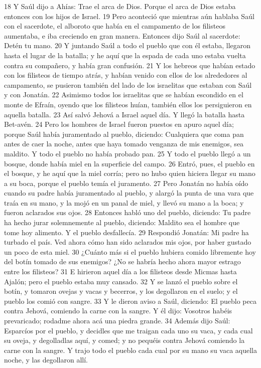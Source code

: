 18 Y Saúl dijo a Ahías: Trae el arca de Dios. Porque el arca de Dios estaba entonces con los hijos de Israel.
19 Pero aconteció que mientras aún hablaba Saúl con el sacerdote, el alboroto que había en el campamento de los filisteos aumentaba, e iba creciendo en gran manera. Entonces dijo Saúl al sacerdote: Detén tu mano.
20 Y juntando Saúl a todo el pueblo que con él estaba, llegaron hasta el lugar de la batalla; y he aquí que la espada de cada uno estaba vuelta contra su compañero, y había gran confusión.
21 Y los hebreos que habían estado con los filisteos de tiempo atrás, y habían venido con ellos de los alrededores al campamento, se pusieron también del lado de los israelitas que estaban con Saúl y con Jonatán.
22 Asimismo todos los israelitas que se habían escondido en el monte de Efraín, oyendo que los filisteos huían, también ellos los persiguieron en aquella batalla.
23 Así salvó Jehová a Israel aquel día. Y llegó la batalla hasta Bet-avén.
24 Pero los hombres de Israel fueron puestos en apuro aquel día; porque Saúl había juramentado al pueblo, diciendo: Cualquiera que coma pan antes de caer la noche, antes que haya tomado venganza de mis enemigos, sea maldito. Y todo el pueblo no había probado pan.
25 Y todo el pueblo llegó a un bosque, donde había miel en la superficie del campo.
26 Entró, pues, el pueblo en el bosque, y he aquí que la miel corría; pero no hubo quien hiciera llegar su mano a su boca, porque el pueblo temía el juramento.
27 Pero Jonatán no había oído cuando su padre había juramentado al pueblo, y alargó la punta de una vara que traía en su mano, y la mojó en un panal de miel, y llevó su mano a la boca; y fueron aclarados sus ojos.
28 Entonces habló uno del pueblo, diciendo: Tu padre ha hecho jurar solemnemente al pueblo, diciendo: Maldito sea el hombre que tome hoy alimento. Y el pueblo desfallecía.
29 Respondió Jonatán: Mi padre ha turbado el país. Ved ahora cómo han sido aclarados mis ojos, por haber gustado un poco de esta miel.
30 ¿Cuánto más si el pueblo hubiera comido libremente hoy del botín tomado de sus enemigos? ¿No se habría hecho ahora mayor estrago entre los filisteos? 
31 E hirieron aquel día a los filisteos desde Micmas hasta Ajalón; pero el pueblo estaba muy cansado.
32 Y se lanzó el pueblo sobre el botín, y tomaron ovejas y vacas y becerros, y los degollaron en el suelo; y el pueblo los comió con sangre.
33 Y le dieron aviso a Saúl, diciendo: El pueblo peca contra Jehová, comiendo la carne con la sangre. Y él dijo: Vosotros habéis prevaricado; rodadme ahora acá una piedra grande.
34 Además dijo Saúl: Esparcíos por el pueblo, y decidles que me traigan cada uno su vaca, y cada cual su oveja, y degolladlas aquí, y comed; y no pequéis contra Jehová comiendo la carne con la sangre. Y trajo todo el pueblo cada cual por su mano su vaca aquella noche, y las degollaron allí.
